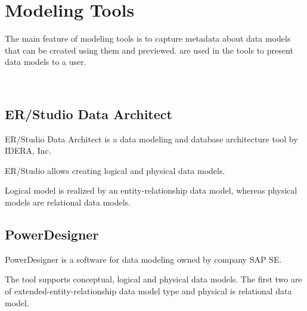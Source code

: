 \chapter{Modeling Tools}

The main feature of modeling tools is to capture metadata about data models that can be created using them and previewed.  are used in the tools to present data models to a user.


\\



\section{ER/Studio Data Architect}

ER/Studio Data Architect is a data modeling and database architecture tool by IDERA, Inc. 

ER/Studio allows creating logical and physical data models.

Logical model is realized by an entity-relationship data model, whereas physical models are relational data models.



\section{PowerDesigner}

PowerDesigner is a software for data modeling owned by company SAP SE.

The tool supports conceptual, logical and physical data models. The first two are of extended-entity-relationship data model type and physical is relational data model. 
